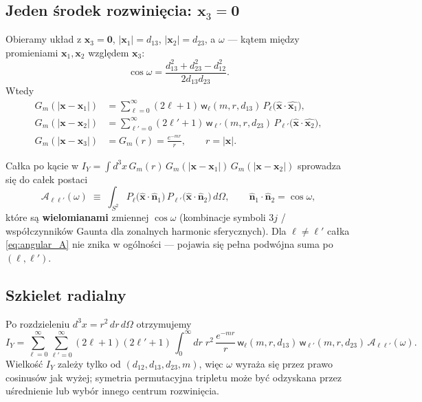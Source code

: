 \subsection{Jeden \'{s}rodek rozwini\k{e}cia: $\mathbf{x}_3=\mathbf{0}$}

Obieramy uk\l{}ad z $\mathbf{x}_3=\mathbf{0}$, $|\mathbf{x}_1|=d_{13}$,
$|\mathbf{x}_2|=d_{23}$, a $\omega$ --- k\k{a}tem mi\k{e}dzy promieniami
$\mathbf{x}_1,\mathbf{x}_2$ wzgl\k{e}dem $\mathbf{x}_3$:
\[
\cos\omega=\frac{d_{13}^2+d_{23}^2-d_{12}^2}{2d_{13}d_{23}}.
\]
Wtedy
\begin{align}
G_m(|\mathbf{x}-\mathbf{x}_1|)
&=
\sum_{\ell=0}^{\infty}(2\ell+1)\,
\mathsf{w}_\ell(m,r,d_{13})\,
P_\ell\bigl(\hat{\mathbf{x}}\cdot\widehat{\mathbf{x}_1}\bigr),
\\
G_m(|\mathbf{x}-\mathbf{x}_2|)
&=
\sum_{\ell'=0}^{\infty}(2\ell'+1)\,
\mathsf{w}_{\ell'}(m,r,d_{23})\,
P_{\ell'}\bigl(\hat{\mathbf{x}}\cdot\widehat{\mathbf{x}_2}\bigr),
\\
G_m(|\mathbf{x}-\mathbf{x}_3|) &= G_m(r)=\frac{e^{-mr}}{r},
\qquad r=|\mathbf{x}|.
\end{align}

Ca\l{}ka po k\k{a}cie w
$I_Y=\int d^3x\,G_m(r)\,G_m(|\mathbf{x}-\mathbf{x}_1|)\,G_m(|\mathbf{x}-\mathbf{x}_2|)$
sprowadza si\k{e} do ca\l{}ek postaci
\begin{equation}
\label{eq:angular_A}
\mathcal{A}_{\ell\ell'}(\omega)
\;\equiv\;
\int_{S^2}
P_\ell\bigl(\hat{\mathbf{x}}\cdot\hat{\mathbf{n}}_1\bigr)\,
P_{\ell'}\bigl(\hat{\mathbf{x}}\cdot\hat{\mathbf{n}}_2\bigr)\,d\Omega,
\qquad
\hat{\mathbf{n}}_1\cdot\hat{\mathbf{n}}_2=\cos\omega,
\end{equation}
kt\'ore s\k{a} \textbf{wielomianami} zmiennej $\cos\omega$ (kombinacje symboli
$3j$ / wsp\'o\l{}czynnik\'ow Gaunta dla zonalnych harmonic sferycznych).
Dla $\ell\neq\ell'$ ca\l{}ka \eqref{eq:angular_A} nie znika w og\'olno\'sci ---
pojawia si\k{e} pe\l{}na podw\'ojna suma po $(\ell,\ell')$.

\subsection{Szkielet radialny}

Po rozdzieleniu $d^3x=r^2\,dr\,d\Omega$ otrzymujemy
\begin{equation}
\label{eq:IY_multipole_double_sum}
\boxed{
I_Y
=
\sum_{\ell=0}^{\infty}\sum_{\ell'=0}^{\infty}
(2\ell+1)(2\ell'+1)\,
\int_{0}^{\infty} dr\; r^2\,\frac{e^{-mr}}{r}\,
\mathsf{w}_\ell(m,r,d_{13})\,
\mathsf{w}_{\ell'}(m,r,d_{23})\,
\mathcal{A}_{\ell\ell'}(\omega).
}
\end{equation}
Wielko\'s\'c $I_Y$ zale\.{z}y tylko od $(d_{12},d_{13},d_{23},m)$, wi\k{e}c
$\omega$ wyra\.{z}a si\k{e} przez prawo cosinus\'ow jak wy\.{z}ej; symetria
permutacyjna tripletu mo\.{z}e by\'c odzyskana przez u\'srednienie lub wyb\'or
innego centrum rozwini\k{e}cia.

